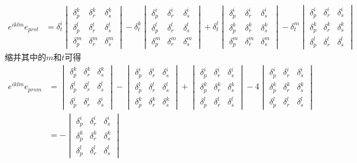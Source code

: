 \begin{align*}
	e^{iklm}e_{prst} & = \delta^i_t \begin{vmatrix}\delta^k_p & \delta^k_r & \delta^k_s \\ \delta^l_p & \delta^l_r & \delta^l_s \\ \delta^m_p & \delta^m_r & \delta^m_s \end{vmatrix} - \delta^k_t \begin{vmatrix} \delta^i_p & \delta^i_r & \delta^i_s \\ \delta^l_p & \delta^l_r & \delta^l_s \\ \delta^m_p & \delta^m_r & \delta^m_s \end{vmatrix} + \delta^l_t \begin{vmatrix} \delta^i_p & \delta^i_r & \delta^i_s \\ \delta^k_p & \delta^k_r & \delta^k_s \\ \delta^m_p & \delta^m_r & \delta^m_s \end{vmatrix} - \delta^m_t \begin{vmatrix} \delta^i_p & \delta^i_r & \delta^i_s \\ \delta^k_p & \delta^k_r & \delta^k_s \\ \delta^l_p & \delta^l_r & \delta^l_s\end{vmatrix}
\end{align*}
缩并其中的$m$和$t$可得
\begin{align*}
	e^{iklm}e_{prsm} & = \begin{vmatrix}\delta^k_p & \delta^k_r & \delta^k_s \\ \delta^l_p & \delta^l_r & \delta^l_s \\ \delta^i_p & \delta^i_r & \delta^i_s \end{vmatrix} - \begin{vmatrix} \delta^i_p & \delta^i_r & \delta^i_s \\ \delta^l_p & \delta^l_r & \delta^l_s \\ \delta^k_p & \delta^k_r & \delta^k_s \end{vmatrix} + \begin{vmatrix} \delta^i_p & \delta^i_r & \delta^i_s \\ \delta^k_p & \delta^k_r & \delta^k_s \\ \delta^l_p & \delta^l_r & \delta^l_s \end{vmatrix} - 4\begin{vmatrix} \delta^i_p & \delta^i_r & \delta^i_s \\ \delta^k_p & \delta^k_r & \delta^k_s \\ \delta^l_p & \delta^l_r & \delta^l_s\end{vmatrix} \\ 
	& = -\begin{vmatrix} \delta^i_p & \delta^i_r & \delta^i_s \\ \delta^k_p & \delta^k_r & \delta^k_s \\ \delta^l_p & \delta^l_r & \delta^l_s\end{vmatrix}
\end{align*}
